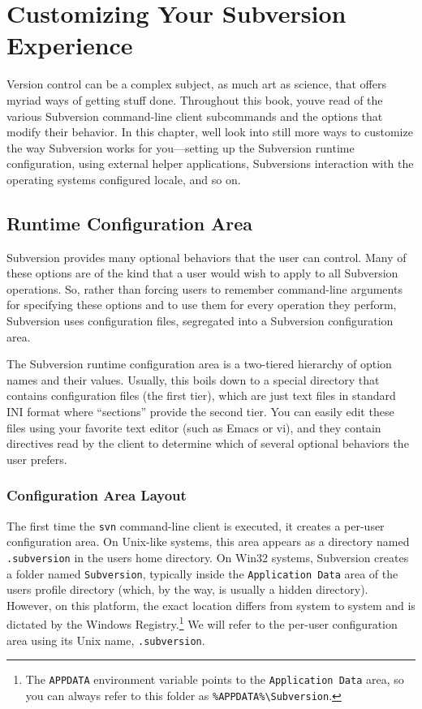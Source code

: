 \chapter{Customizing Your Subversion
Experience}\label{svn.customization}

Version control can be a complex subject, as much art as science, that
offers myriad ways of getting stuff done. Throughout this book,
you\textquotesingle ve read of the various Subversion command-line
client subcommands and the options that modify their behavior. In this
chapter, we\textquotesingle ll look into still more ways to customize
the way Subversion works for you---setting up the Subversion runtime
configuration, using external helper applications,
Subversion\textquotesingle s interaction with the operating
system\textquotesingle s configured locale, and so on.

\section{Runtime Configuration Area}\label{svn.advanced.confarea}

Subversion provides many optional behaviors that the user can control.
Many of these options are of the kind that a user would wish to apply to
all Subversion operations. So, rather than forcing users to remember
command-line arguments for specifying these options and to use them for
every operation they perform, Subversion uses configuration files,
segregated into a Subversion configuration area.

The Subversion runtime configuration area is a two-tiered hierarchy of
option names and their values. Usually, this boils down to a special
directory that contains configuration files (the first tier), which are
just text files in standard INI format where ``sections'' provide the
second tier. You can easily edit these files using your favorite text
editor (such as Emacs or vi), and they contain directives read by the
client to determine which of several optional behaviors the user
prefers.

\subsection{Configuration Area
Layout}\label{svn.advanced.confarea.layout}

The first time the \texttt{svn} command-line client is executed, it
creates a per-user configuration area. On Unix-like systems, this area
appears as a directory named \texttt{.subversion} in the
user\textquotesingle s home directory. On Win32 systems, Subversion
creates a folder named \texttt{Subversion}, typically inside the
\texttt{Application\ Data} area of the user\textquotesingle s profile
directory (which, by the way, is usually a hidden directory). However,
on this platform, the exact location differs from system to system and
is dictated by the Windows Registry.\footnote{The \texttt{APPDATA}
  environment variable points to the \texttt{Application\ Data} area, so
  you can always refer to this folder as
  \texttt{\%APPDATA\%\textbackslash{}Subversion}.} We will refer to the
per-user configuration area using its Unix name, \texttt{.subversion}.

